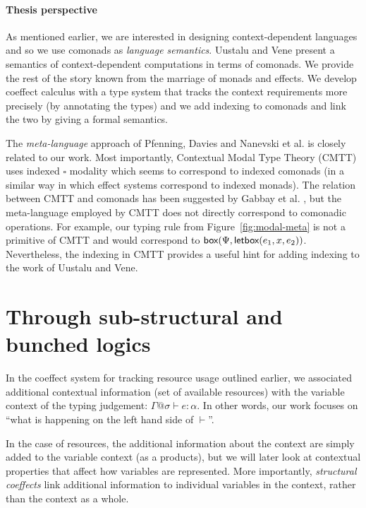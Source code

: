 \paragraph{Thesis perspective}
As mentioned earlier, we are interested in designing context-dependent languages and so we
use comonads as \emph{language semantics}. Uustalu and Vene present a semantics of 
context-dependent computations in terms of comonads. We provide the rest of the story known 
from the marriage of monads and effects. We develop coeffect calculus with a type system that 
tracks the context requirements more precisely (by annotating the types) and we add indexing 
to comonads and link the two by giving a formal semantics. 

The \emph{meta-language} approach of Pfenning, Davies and Nanevski et al. is closely related to
our work. Most importantly, Contextual Modal Type Theory (CMTT) uses indexed $\square$ modality
which seems to correspond to indexed comonads (in a similar way in which effect systems 
correspond to indexed monads). The relation between CMTT and comonads has been suggested by
Gabbay et al. \cite{logic-cmtt-semantics}, but the meta-language employed by CMTT does not 
directly correspond to comonadic operations. For example, our  typing rule from
Figure~\ref{fig:modal-meta} is not a primitive of CMTT and would correspond to 
$\textnormal{\sffamily box}(\Psi, \textnormal{\sffamily letbox}(e_1, x, e_2))$. Nevertheless, the indexing in CMTT provides a useful
hint for adding indexing to the work of Uustalu and Vene.


\section{Through sub-structural and bunched logics}
\label{sec:path-logic}

In the coeffect system for tracking resource usage outlined earlier, we associated additional
contextual information (set of available resources) with the variable context of the typing 
judgement: $\Gamma @ \sigma \vdash e : \alpha$. In other words, our work focuses on ``what is
happening on the left hand side of $\vdash$''.

In the case of resources, the additional information about the context are simply added to the
variable context (as a products), but we will later look at contextual properties that affect 
how variables are represented. More importantly, \emph{structural coeffects} link additional
information to individual variables in the context, rather than the context as a whole.

